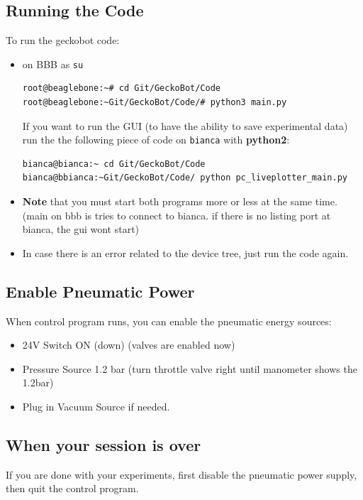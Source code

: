 \documentclass[
	fontsize=10pt
	paper=a4
]{scrartcl}
\begin{document}
\subsection{Running the Code}
To run the geckobot code:
\begin{itemize}
\item on BBB as \texttt{su}
\begin{lstlisting}
root@beaglebone:~# cd Git/GeckoBot/Code
root@beaglebone:~Git/GeckoBot/Code/# python3 main.py
\end{lstlisting}

If you want to run the GUI (to have the ability to save experimental data) run the the following piece of code on \texttt{bianca} with \textbf{python2}:
\begin{lstlisting}
bianca@bianca:~ cd Git/GeckoBot/Code
bianca@bbianca:~Git/GeckoBot/Code/ python pc_liveplotter_main.py
\end{lstlisting}
\item \textbf{Note} that you must start both programs more or less at the same time. (main on bbb is tries to connect to bianca. if there is no listing port at bianca, the gui wont start)

\item In case there is an error related to the device tree, just run the code again.

\end{itemize}





\subsection{Enable Pneumatic Power}
When control program runs, you can enable the pneumatic energy sources:

\begin{itemize}
\item 24V Switch ON (down) (valves are enabled now)
\item Pressure Source 1.2 bar (turn throttle valve right until manometer shows the 1.2bar)
\item Plug in Vacuum Source if needed.

\end{itemize}



\subsection{When your session is over}
If you are done with your experiments, first disable the pneumatic power supply, then quit the control program.
\end{document}
